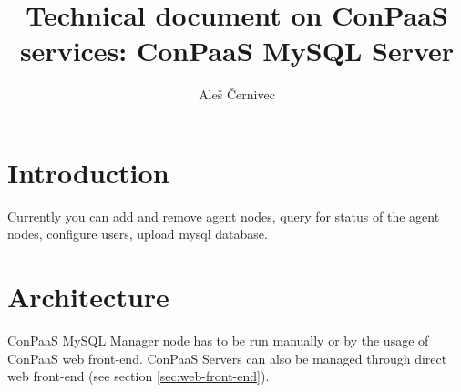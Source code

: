 \documentclass[a4paper,10pt]{article}
\begin{document}
\title{Technical document on ConPaaS services: ConPaaS MySQL Server}
\vspace{15pt}
\author{Ale{\v s} {\v C}ernivec}
\vspace{50pt}
\maketitle
\vspace{15pt}
\setlength{\parindent}{15pt}
\newpage
\tableofcontents
\newpage
\newcommand{\Cmd}[1]{\noindent {\tt #1 }\newline\vspace{2pt}\\}
\newcommand{\Des}[1]{\vspace{4pt}\noindent {\bf Description: }\\{#1}\vspace{2pt}\\ }
\newcommand{\Par}[1]{\vspace{4pt}\noindent {\bf Parameters: } \\{#1}\vspace{2pt}\\}
\newcommand{\Ret}[1]{\vspace{4pt}\noindent {\bf Returns: }\\{#1}\vspace{2pt}\\}
\newcommand{\Rai}[1]{\vspace{4pt}\noindent {\bf Raises: }\\{#1}\vspace{2pt}\\}
\newcommand{\conapi}[5]{\Cmd{#1} \Des{#2} \Par{#3} \Ret{#4} \Rai{#5}\\}

\section{Introduction}

Currently you can add and remove agent nodes, query for status of the agent nodes, configure users, upload mysql database. 

\section{Architecture}

ConPaaS MySQL Manager node has to be run manually or by the usage of ConPaaS web front-end. ConPaaS Servers can also be managed through direct web front-end (see section \ref{sec:web-front-end}).
\end{document}
